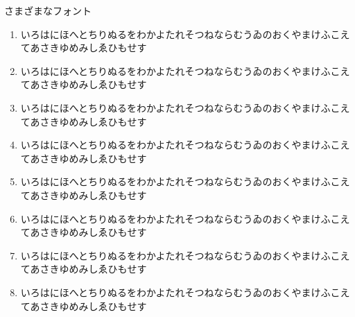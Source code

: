 \documentclass[aspectratio=169, xcolor={dvipsnames,table}]{beamer}
\begin{document}
  \begin{frame}[plain]{さまざまなフォント}
    \small
    \begin{enumerate}

      \item { いろはにほへとちりぬるをわかよたれそつねならむうゐのおくやまけふこえてあさきゆめみしゑひもせす}


      \item { いろはにほへとちりぬるをわかよたれそつねならむうゐのおくやまけふこえてあさきゆめみしゑひもせす}


      \item { いろはにほへとちりぬるをわかよたれそつねならむうゐのおくやまけふこえてあさきゆめみしゑひもせす}


      \item { いろはにほへとちりぬるをわかよたれそつねならむうゐのおくやまけふこえてあさきゆめみしゑひもせす}



      \item { いろはにほへとちりぬるをわかよたれそつねならむうゐのおくやまけふこえてあさきゆめみしゑひもせす}


      \item { いろはにほへとちりぬるをわかよたれそつねならむうゐのおくやまけふこえてあさきゆめみしゑひもせす}


      \item { いろはにほへとちりぬるをわかよたれそつねならむうゐのおくやまけふこえてあさきゆめみしゑひもせす}

      \item { いろはにほへとちりぬるをわかよたれそつねならむうゐのおくやまけふこえてあさきゆめみしゑひもせす}
    \end{enumerate}
  \end{frame}
\end{document}
